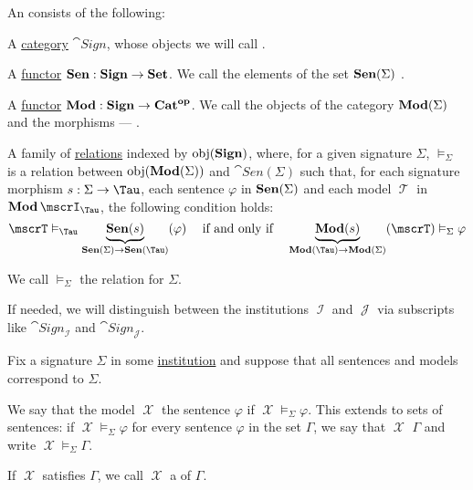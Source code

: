 \begin{definition}\label{def:institution}
  An  consists of the following:
  \begin{thmenum}
     A \hyperref[def:category]{category} \( \cat{Sign} \), whose objects we will call .

     A \hyperref[def:functor]{functor} \( \op*{Sen}: \cat{Sign} \to \cat{Set} \). We call the elements of the set \( \op*{Sen}(\Sigma) \) .

     A \hyperref[def:functor]{functor} \( \cat{Mod}: \cat{Sign} \to \cat{Cat}^{\oppos} \). We call the objects of the category \( \op*{Mod}(\Sigma) \)  and the morphisms --- .

     A family of \hyperref[def:relation]{relations} indexed by \( \obj(\cat{Sign}) \), where, for a given signature \( \Sigma \), \( \vDash_\Sigma \) is a relation between \( \obj(\op*{Mod}(\Sigma)) \) and \( \cat{Sen}(\Sigma) \) such that, for each signature morphism \( s: \Sigma \to \Tau \), each sentence \( \varphi \) in \( \op*{Sen}(\Sigma) \) and each model \( \mscrT \) in \( \op*{Mod}\mscrI_\Tau \), the following condition holds:
    \begin{equation}\label{eq:def:institution/satisfaction}
      \mscrT \vDash_\Tau \underbrace{\op*{Sen}(s)}_{\op*{Sen}(\Sigma) \to \op*{Sen}(\Tau)}(\varphi)
      \quad\T{if and only if}\quad
      \underbrace{\op*{Mod}(s)}_{\op*{Mod}(\Tau) \to \op*{Mod}(\Sigma)}(\mscrT) \vDash_\Sigma \varphi
    \end{equation}

    We call \( \vDash_\Sigma \) the  relation for \( \Sigma \).
  \end{thmenum}
\end{definition}
\begin{comments}
  \item If needed, we will distinguish between the institutions \( \mscrI \) and \( \mscrJ \) via subscripts like \( \cat{Sign}_\mscrI \) and \( \cat{Sign}_\mscrJ \).
\end{comments}

\begin{definition}\label{def:institutional_satisfaction}
  Fix a signature \( \Sigma \) in some \hyperref[def:institution]{institution} and suppose that all sentences and models correspond to \( \Sigma \).

  We say that the model \( \mscrX \)  the sentence \( \varphi \) if \( \mscrX \vDash_\Sigma \varphi \). This extends to sets of sentences: if \( \mscrX \vDash_\Sigma \varphi \) for every sentence \( \varphi \) in the set \( \Gamma \), we say that \( \mscrX \)  \( \Gamma \) and write \( \mscrX \vDash_\Sigma \Gamma \).

  If \( \mscrX \) satisfies \( \Gamma \), we call \( \mscrX \) a  of \( \Gamma \).
\end{definition}


